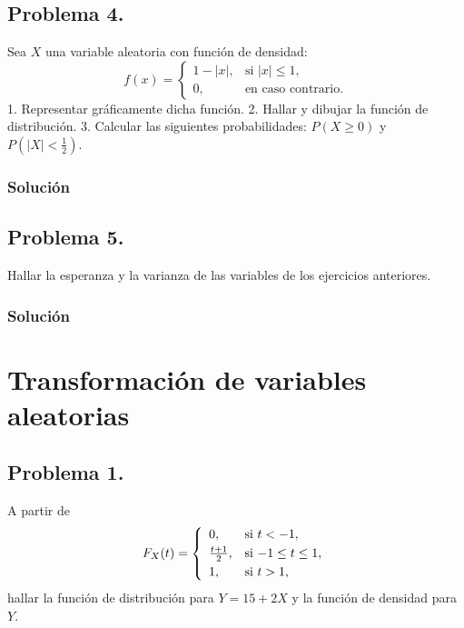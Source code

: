 \documentclass[]{article}
\begin{document}
{{\hypertarget{problema-4.-1}{%
\subsection{Problema 4.}\label{problema-4.-1}}

Sea \(X\) una variable aleatoria con función de densidad: \[
f(x)=\begin{cases}
1-|x|, & \mbox{si }|x|\leq 1,\\
0, & \mbox{en caso contrario.}
\end{cases}
\] 1. Representar gráficamente dicha función. 2. Hallar y dibujar la
función de distribución. 3. Calcular las siguientes probabilidades:
\(P(X\geq 0)\) y \(P\left(|X|<\frac{1}{2}\right).\)

\hypertarget{soluciuxf3n-9}{%
\subsubsection{Solución}\label{soluciuxf3n-9}}

\hypertarget{problema-5.-1}{%
\subsection{Problema 5.}\label{problema-5.-1}}

Hallar la esperanza y la varianza de las variables de los ejercicios
anteriores.

\hypertarget{soluciuxf3n-10}{%
\subsubsection{Solución}\label{soluciuxf3n-10}}

\hypertarget{transformaciuxf3n-de-variables-aleatorias}{%
\section{Transformación de variables
aleatorias}\label{transformaciuxf3n-de-variables-aleatorias}}

\hypertarget{problema-1.-2}{%
\subsection{Problema 1.}\label{problema-1.-2}}

A partir de \[
F_X(t)=
\left\{\begin{array}{ll}
0, & \mbox{si $t<-1$},
\\[0.1cm]
{t+1\over 2}, & \mbox{si $-1\leq t\leq
1$},
 \\[0.1cm]
1, & \mbox{si $t>1$},
\end{array}\right.
\] hallar la función de distribución para \(Y=15+2X\) y la función de
densidad para \(Y\).

}}
\end{document}
